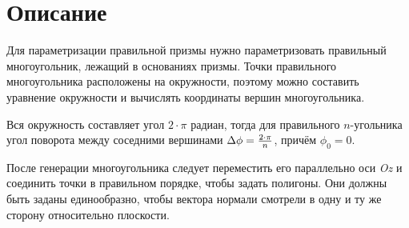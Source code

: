 \section{Описание}
Для параметризации правильной призмы нужно параметризовать правильный многоугольник, лежащий в основаниях призмы. Точки правильного многоугольника расположены на окружности, поэтому можно составить уравнение окружности и вычислять координаты вершин многоугольника.

Вся окружность составляет угол $2 \cdot \pi$ радиан, тогда для правильного $n$-угольника угол поворота между соседними вершинами $\Delta\phi = {{2 \cdot \pi} \over n}$, причём $\phi_0 = 0$.

После генерации многоугольника следует переместить его параллельно оси \textit{Oz} и соединить точки в правильном порядке, чтобы задать полигоны. Они должны быть заданы единообразно, чтобы вектора нормали смотрели в одну и ту же сторону относительно плоскости.
\pagebreak
